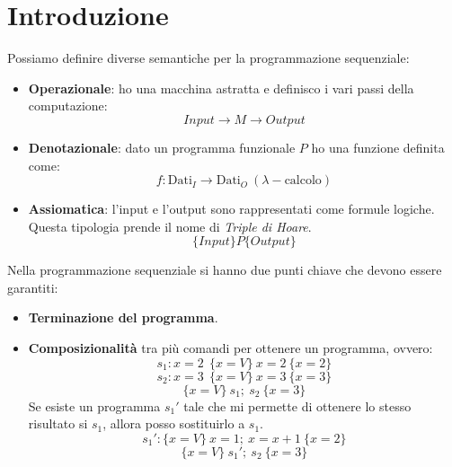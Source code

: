 \chapter{Introduzione}
Possiamo definire diverse semantiche per la programmazione sequenziale:
\begin{itemize}
    \item \textbf{Operazionale}: ho una macchina astratta e definisco i vari passi della computazione: $$ Input \longrightarrow M \longrightarrow Output$$
    \item \textbf{Denotazionale}: dato un programma funzionale $P$ ho una funzione definita come: $$f: \text{Dati}_{I} \to \text{Dati}_{O} \ ( \lambda-\text{calcolo})$$
    \item \textbf{Assiomatica}: l'input e l'output sono rappresentati come formule logiche. Questa tipologia prende il nome di \textit{Triple di Hoare}. $$\{Input\} P \{Output\}$$
\end{itemize}

Nella programmazione sequenziale si hanno due punti chiave che devono essere garantiti:
\begin{itemize}
    \item \textbf{Terminazione del programma}.
    \item \textbf{Composizionalità} tra più comandi per ottenere un programma, ovvero:
    $$s_1: x = 2 \ \ \{x = V\} \ x = 2 \ \{x = 2\}$$
    $$s_2: x = 3 \ \ \{x = V\} \ x = 3 \ \{x = 3\}$$
    $$\{x = V\} \ s_1; \ s_2 \ \{x = 3\}$$
    Se esiste un programma $s_1'$ tale che mi permette di ottenere lo stesso risultato si $s_1$, allora posso sostituirlo a $s_1$.
    $$s_1':  \{x = V\} \ x = 1; \ x = x + 1\ \{x = 2\}$$
    $$\{x = V\} \ s_1'; \ s_2 \ \{x = 3\}$$
\end{itemize}

